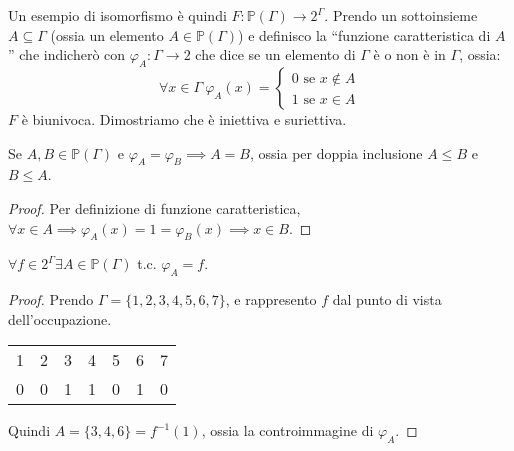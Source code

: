 Un esempio di isomorfismo \`e quindi $F : \mathbb{P}(\Gamma) \to 2^{\Gamma}$. Prendo un sottoinsieme $A \subseteq \Gamma$ (ossia un elemento $A \in \mathbb{P}(\Gamma)$) e definisco la ``funzione caratteristica di $A$'' che indicher\`o con $\varphi_{A} : \Gamma \to 2$ che dice se un elemento di $\Gamma$ \`e o non \`e in $\Gamma$, ossia:
\[
\forall x \in \Gamma \ \varphi_A (x) = 
\begin{cases}
0 \text{ se } x \notin A \\
1 \text{ se } x \in A
\end{cases}
\]
$F$ \`e biunivoca. Dimostriamo che \`e iniettiva e suriettiva.
\begin{prop}
Se $A, B \in \mathbb{P}(\Gamma)$ e $\varphi_A = \varphi_B \implies A = B$, ossia per doppia inclusione $A \le B$ e $B \le A$.
\end{prop}
\begin{proof}
Per definizione di funzione caratteristica, $\forall x \in A \implies \varphi_A(x) = 1 = \varphi_B(x) \implies x \in B$.
\end{proof}
\begin{prop}
$\forall f \in 2^{\Gamma} \exists A \in \mathbb{P}(\Gamma)$ t.c. $\varphi_A = f$.
\end{prop}
\begin{proof}
Prendo $\Gamma = \{ 1, 2, 3, 4, 5, 6, 7\}$, e rappresento $f$ dal punto di vista dell'occupazione.

\begin{tabular}{*{7}{c}}
1 & 2 & 3 & 4 & 5 & 6 & 7 \\
0 & 0 & 1 & 1 & 0 & 1 & 0
\end{tabular}

Quindi $A = \{ 3, 4, 6 \} = f^{-1} (1)$, ossia la controimmagine di $\varphi_A$.
\end{proof}

